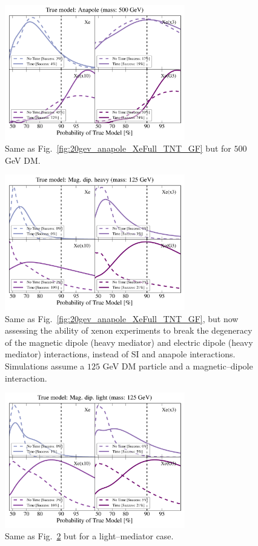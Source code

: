 \documentclass[11pt, a4paper]{article}
\newcommand{\Fig}[1]{Fig.~\ref{#1}} \newcommand{\Figs}[2]{Figs.~\ref{#1} and \ref{#2}}
\begin{document}
\begin{figure}
\centering
\includegraphics[width=0.7\textwidth]{plots/PDF_500GeV_Anapole_50sims_Xe_Xe3x_Xe10x_XeG3_GF_TNT.pdf}
\caption{\label{fig:500gev_anapole_XeFull_TNT_GF}
Same as Fig.~\ref{fig:20gev_anapole_XeFull_TNT_GF} but for $500$ GeV DM.}
\end{figure}
\begin{figure}
\centering
\includegraphics[width=0.7\textwidth]{plots/PDF_125GeV_Magdipheavy_50sims_Xe_Xe3x_Xe10x_XeG3_GF_TNT.pdf}
\caption{\label{fig:125gev_Mag.dip.heavy_XeFull_TNT_GF}
Same as Fig.~\ref{fig:20gev_anapole_XeFull_TNT_GF}, but now assessing the ability of xenon experiments to break the degeneracy of the magnetic dipole (heavy mediator) and electric dipole (heavy mediator) interactions, instead of SI and anapole interactions. Simulations assume a $125$ GeV DM particle and a magnetic--dipole interaction.}
\end{figure}
\begin{figure}
\centering
\includegraphics[width=0.7\textwidth]{plots/PDF_125GeV_Magdiplight_50sims_Xe_Xe3x_Xe10x_XeG3_GF_TNT.pdf}
\caption{\label{fig:125gev_Mag.dip.light_XeFull_TNT_GF}
Same as \Fig{fig:125gev_Mag.dip.heavy_XeFull_TNT_GF} but for a light--mediator case. }
\end{figure}
\end{document}
